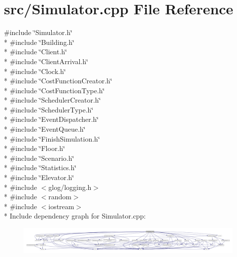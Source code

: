\section{src/\+Simulator.cpp File Reference}
\label{_simulator_8cpp}
{\ttfamily \#include \char`\"{}Simulator.\+h\char`\"{}}\\*
{\ttfamily \#include \char`\"{}Building.\+h\char`\"{}}\\*
{\ttfamily \#include \char`\"{}Client.\+h\char`\"{}}\\*
{\ttfamily \#include \char`\"{}Client\+Arrival.\+h\char`\"{}}\\*
{\ttfamily \#include \char`\"{}Clock.\+h\char`\"{}}\\*
{\ttfamily \#include \char`\"{}Cost\+Function\+Creator.\+h\char`\"{}}\\*
{\ttfamily \#include \char`\"{}Cost\+Function\+Type.\+h\char`\"{}}\\*
{\ttfamily \#include \char`\"{}Scheduler\+Creator.\+h\char`\"{}}\\*
{\ttfamily \#include \char`\"{}Scheduler\+Type.\+h\char`\"{}}\\*
{\ttfamily \#include \char`\"{}Event\+Dispatcher.\+h\char`\"{}}\\*
{\ttfamily \#include \char`\"{}Event\+Queue.\+h\char`\"{}}\\*
{\ttfamily \#include \char`\"{}Finish\+Simulation.\+h\char`\"{}}\\*
{\ttfamily \#include \char`\"{}Floor.\+h\char`\"{}}\\*
{\ttfamily \#include \char`\"{}Scenario.\+h\char`\"{}}\\*
{\ttfamily \#include \char`\"{}Statistics.\+h\char`\"{}}\\*
{\ttfamily \#include \char`\"{}Elevator.\+h\char`\"{}}\\*
{\ttfamily \#include $<$glog/logging.\+h$>$}\\*
{\ttfamily \#include $<$random$>$}\\*
{\ttfamily \#include $<$iostream$>$}\\*
Include dependency graph for Simulator.\+cpp\+:
\nopagebreak
\begin{figure}[H]
\begin{center}
\leavevmode
\includegraphics[width=350pt]{_simulator_8cpp__incl}
\end{center}
\end{figure}
